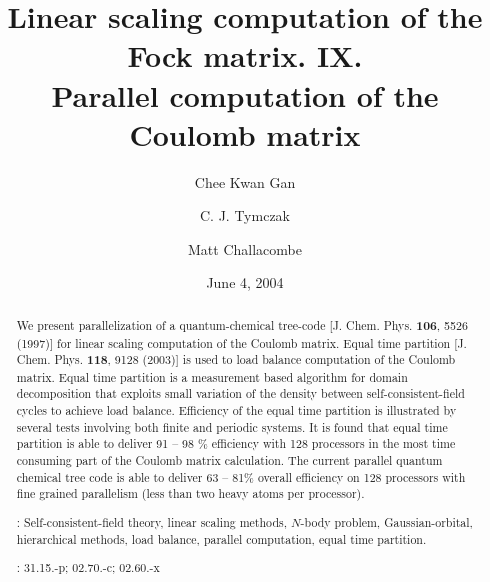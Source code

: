 \commentoutA{\documentclass[prl,aps,twocolumn,twocolumngrid,superbib]{revtex4}}
\begin{document}
\title[Short Title]{
Linear scaling computation of the Fock matrix. IX. \\
Parallel computation of the Coulomb matrix\footnotemark[1]}

\author{Chee Kwan Gan\footnotemark[2]}
\author{C. J. Tymczak}
\author{Matt Challacombe}


\date{June 4, 2004}

\begin{abstract}
We present parallelization of a quantum-chemical tree-code
[J. Chem. Phys. {\bf 106}, 5526 (1997)] for linear scaling computation
of the Coulomb matrix.  Equal time partition [J. Chem. Phys. {\bf
118}, 9128 (2003)] is used to load balance computation of the Coulomb
matrix. Equal time partition is a measurement based algorithm for
domain decomposition that exploits small variation of the density
between self-consistent-field cycles to achieve load balance.
Efficiency of the equal time partition is illustrated by several tests
involving both finite and periodic systems.  It is found that equal time
partition is able to deliver 91 -- 98 \% efficiency with 128
processors in the most time consuming part of the
Coulomb matrix calculation.  The current parallel quantum chemical
tree code is able to deliver 63 -- 81\% overall efficiency on 128
processors with fine grained parallelism (less than two heavy atoms
per processor).


\smallskip
{}:
Self-consistent-field theory, linear scaling methods, $N$-body problem,
Gaussian-orbital, hierarchical methods, load balance, parallel computation,
equal time partition.

: 
31.15.-p; 02.70.-c; 02.60.-x
\end{abstract}
\maketitle
\end{document}
